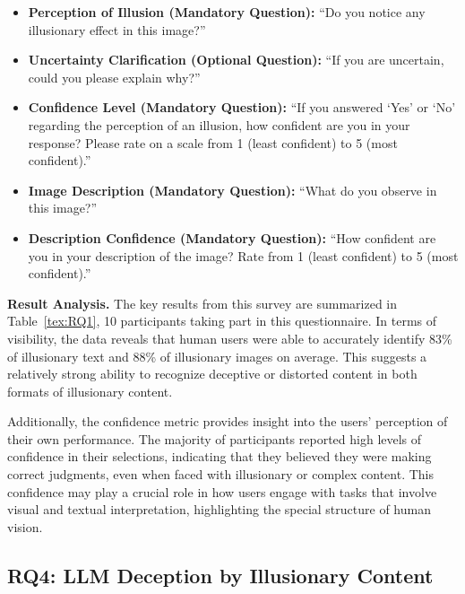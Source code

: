 \begin{itemize}[leftmargin=*]
    \item \textbf{Perception of Illusion (Mandatory Question):} ``Do you notice any illusionary effect in this image?''
    
    \item \textbf{Uncertainty Clarification (Optional Question):} ``If you are uncertain, could you please explain why?''
    
    \item \textbf{Confidence Level (Mandatory Question):} ``If you answered `Yes' or `No' regarding the perception of an illusion, how confident are you in your response? Please rate on a scale from 1 (least confident) to 5 (most confident).''
    
    \item \textbf{Image Description (Mandatory Question):} ``What do you observe in this image?''
    
    \item \textbf{Description Confidence (Mandatory Question):} ``How confident are you in your description of the image? Rate from 1 (least confident) to 5 (most confident).''
\end{itemize}


\noindent\textbf{Result Analysis.} The key results from this survey are summarized in Table~\ref{tex:RQ1}, 10 participants taking part in this questionnaire. In terms of visibility, the data reveals that human users were able to accurately identify 83\% of illusionary text and 88\% of illusionary images on average. This suggests a relatively strong ability to recognize deceptive or distorted content in both formats of 
illusionary content.

Additionally, the confidence metric provides insight into the users' perception of their own performance. The majority of participants reported high levels of confidence in their selections, indicating that they believed they were making correct judgments, even when faced with illusionary or complex content. This confidence may play a crucial role in how users engage with tasks that involve visual and textual interpretation, highlighting the special structure of human vision.





\subsection{RQ4: LLM Deception by Illusionary Content} 

